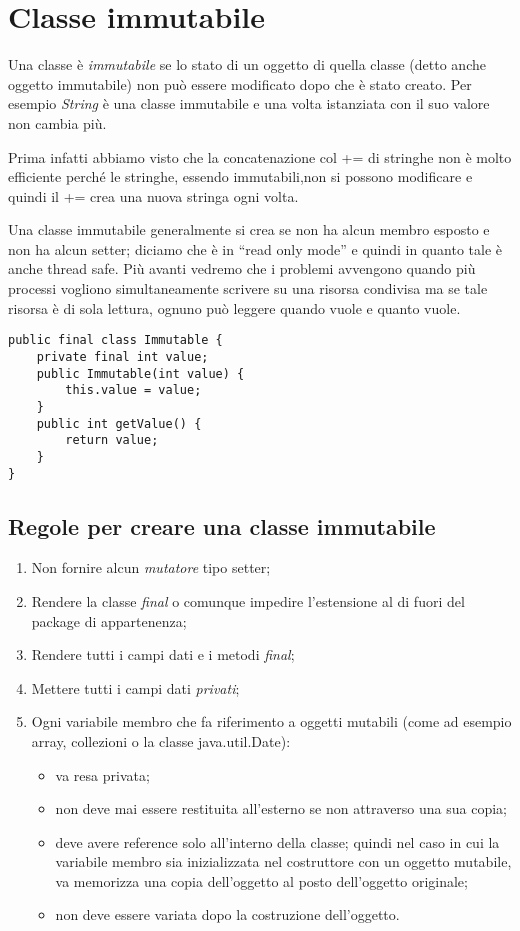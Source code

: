 \section{Classe immutabile}
Una classe è \textit{immutabile} se lo stato di un oggetto di quella classe (detto anche oggetto immutabile) non può essere modificato dopo che è stato creato.
Per esempio \textit{String} è una classe immutabile e una volta istanziata con il suo valore non cambia più.

Prima infatti abbiamo visto che la concatenazione col += di stringhe non è molto efficiente perché le stringhe, essendo immutabili,non si possono modificare e quindi il += crea una nuova stringa ogni volta.

Una classe immutabile generalmente si crea se non ha alcun membro esposto e non ha alcun setter; diciamo che è in “read only mode” e quindi in quanto tale è anche thread safe. Più avanti vedremo che i problemi avvengono quando più processi vogliono simultaneamente scrivere su una risorsa condivisa ma se tale risorsa è di sola lettura, ognuno può leggere quando vuole e quanto vuole. 

\begin{lstlisting}
public final class Immutable {
    private final int value;
    public Immutable(int value) {
        this.value = value;
    }
    public int getValue() {
        return value;
    }
}
\end{lstlisting}

\subsection{Regole per creare una classe immutabile}
\begin{enumerate}
	\item Non fornire alcun \textit{mutatore} tipo setter;
	\item Rendere la classe \textit{final} o comunque impedire l’estensione al di fuori del package di appartenenza;
	\item Rendere tutti i campi dati e i metodi \textit{final};
	\item Mettere tutti i campi dati \textit{privati};
	\item Ogni variabile membro che fa riferimento a oggetti mutabili (come ad esempio array, collezioni o la classe java.util.Date):
		\begin{itemize}
			\item va resa privata;
			\item non deve mai essere restituita all’esterno se non attraverso una sua copia;
			\item deve avere reference solo all’interno della classe; quindi nel caso in cui la variabile membro sia inizializzata nel costruttore con un oggetto mutabile, va memorizza una copia dell’oggetto al posto dell’oggetto originale;
			\item non deve essere variata dopo la costruzione dell’oggetto.
		\end{itemize}
\end{enumerate}

